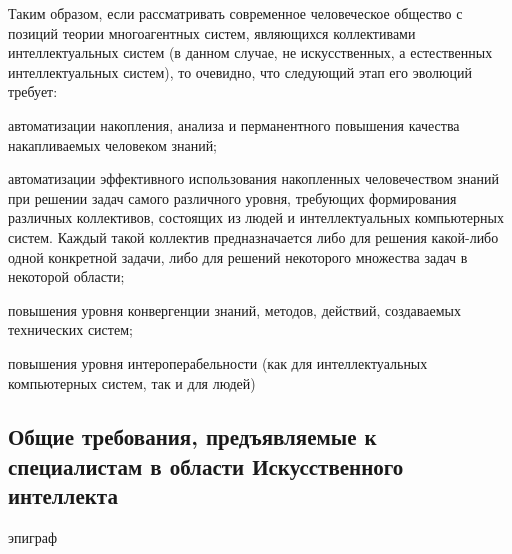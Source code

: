 Таким образом, если рассматривать современное человеческое общество с позиций теории многоагентных систем, являющихся коллективами интеллектуальных систем (в данном случае, не искусственных, а естественных интеллектуальных систем), то очевидно, что следующий этап его эволюций требует:
\begin{textitemize}
	\item автоматизации накопления, анализа и перманентного повышения качества накапливаемых человеком знаний;
	\item автоматизации эффективного использования накопленных человечеством знаний при решении задач самого различного уровня, требующих формирования различных коллективов, состоящих из людей и интеллектуальных компьютерных систем. Каждый такой коллектив предназначается либо для решения какой-либо одной конкретной задачи, либо для решений некоторого множества задач в некоторой области;
	\item повышения уровня конвергенции знаний, методов, действий, создаваемых технических систем;
	\item повышения уровня интероперабельности (как для интеллектуальных компьютерных систем, так и для людей) 
\end{textitemize}

\subsection*{Общие требования, предъявляемые к специалистам в области Искусственного интеллекта}

\begin{SCn}
	\begin{scnrelfromlist}{эпиграф}
	\end{scnrelfromlist}
\end{SCn}

